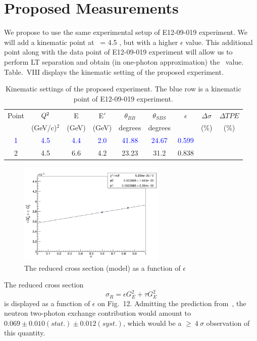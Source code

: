 \section{Proposed Measurements} 
%

We propose to use the same experimental setup of E12-09-019 experiment. 
We will add a kinematic point at \qsq~= 4.5 \gevcsq, but with a higher $\epsilon$ value. 
This additional point along with the data point of E12-09-019 experiment will allow us to perform LT separation and 
obtain (in one-photon approximation) the \gen~value. 
Table.~VIII %
displays the kinematic setting of the proposed experiment. 
%
\begin{center}
\begin{table}[h]
\begin{tabular}{|c|c|c|c|c|c|c|c|c|}
\hline
\small{Point} & $Q\textsuperscript{2}$  & E & E$'$  & $\theta_{BB}$ & $\theta_{SBS}$ & $\epsilon$ &$\Delta \sigma$ & $\Delta TPE$\\
& (GeV/c)$^2$ & (GeV) & (GeV)  & degrees & degrees   &  & (\%)& (\%) \\
\hline
\textcolor{blue}
 1&\textcolor{blue} {4.5} & \textcolor{blue}{4.4} & \textcolor{blue}{2.0} & \textcolor{blue}{41.88}  & \textcolor{blue}{24.67} & \textcolor{blue}{0.599} & & \\
\hline
2 & 4.5  &  6.6  &  4.2  & 23.23  &  31.2  &  0.838 & & \\
\hline
\end{tabular} 
\caption{Kinematic settings of the proposed experiment. The blue row is a kinematic point of E12-09-019 experiment.}
\label{tab:table1}
\end{table}
\end{center}
%
\begin{figure}[!h]
  \begin{center}
    \includegraphics[width=7cm]{Plots/reduced.png}
    \caption{The reduced cross section (model) as a function of $\epsilon$}
    \label{fig:sigmaR_feps}
  \end{center}
\end{figure}
%
%
The reduced cross section
%
\begin{equation}
  \sigma_R = %
  \epsilon G_E^2 + \tau G_E^2 
\end{equation}
%
is displayed as a function of $\epsilon$ on Fig.~12.%
Admitting the prediction from~\cite{Blunden:2005ew}, the neutron two-photon exchange contribution would amount to $0.069 \pm 0.010(stat.) \pm 0.012(syst.)$, which would be a $\geq~4~\sigma$ observation of this quantity.
